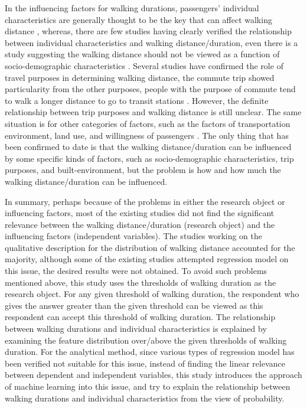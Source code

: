 %
In the influencing factors for walking durations, passengers' individual characteristics are generally thought to be the key that can affect walking distance \cite{Besser2005,WeinsteinAgrawal2008,Krygsman2004,Yang2012,Daniels2013,Guerra2012}, whereas, there are few studies having clearly verified the relationship between individual characteristics and walking distance/duration, even there is a study suggesting the walking distance should not be viewed as a function of socio-demographic characteristics \cite{Krygsman2004}. Several studies have confirmed the role of travel purposes in determining walking distance, the commute trip showed particularity from the other purposes, people with the purpose of commute tend to walk a longer distance to go to transit stations \cite{Larsen2010}. However, the definite relationship between trip purposes and walking distance is still unclear. The same situation is for other categories of factors, such as the factors of transportation environment, land use, and willingness of passengers \cite{Guerra2012,Krygsman2004,WeinsteinAgrawal2008}. The only thing that has been confirmed to date is that the walking distance/duration can be influenced by some specific kinds of factors, such as socio-demographic characteristics, trip purposes, and built-environment, but the problem is how and how much the walking distance/duration can be influenced.

%
In summary, perhaps because of the problems in either the research object or influencing factors, most of the existing studies did not find the significant relevance between the walking distance/duration (research object) and the influencing factors (independent variables). The studies working on the qualitative description for the distribution of walking distance accounted for the majority, although some of the existing studies attempted regression model on this issue, the desired results were not obtained. To avoid such problems mentioned above, this study uses the thresholds of walking duration as the research object. For any given threshold of walking duration, the respondent who gives the answer greater than the given threshold can be viewed as this respondent can accept this threshold of walking duration. The relationship between walking durations and individual characteristics is explained by examining the feature distribution over/above the given thresholds of walking duration. For the analytical method, since various types of regression model has been verified not suitable for this issue, instead of finding the linear relevance between dependent and independent variables, this study introduces the approach of machine learning into this issue, and try to explain the relationship between walking durations and individual characteristics from the view of probability.

%
%